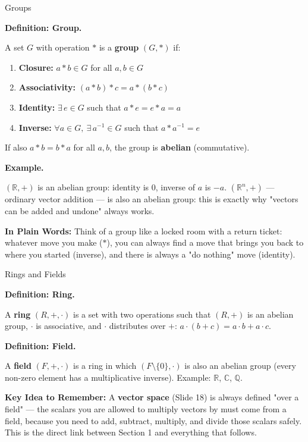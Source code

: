 \documentclass[9pt,aspectratio=169]{beamer}
\newcommand{\keyidea}[1]{%
\par\medskip\noindent\textbf{Key Idea to Remember:} #1\par\medskip}
\newcommand{\childex}[1]{%
\par\medskip\noindent\textbf{In Plain Words:} #1\par\medskip}
\begin{document}
\begin{frame}{Groups}
\par\noindent\textbf{Definition: Group.}\par
A set $G$ with operation $*$ is a \textbf{group} $(G,*)$ if:
\begin{enumerate}
\item \textbf{Closure:} $a*b \in G$ for all $a,b \in G$
\item \textbf{Associativity:} $(a*b)*c = a*(b*c)$
\item \textbf{Identity:} $\exists\, e \in G$ such that $a*e = e*a = a$
\item \textbf{Inverse:} $\forall a \in G,\ \exists\, a^{-1} \in G$ such that $a*a^{-1}=e$
\end{enumerate}
If also $a*b = b*a$ for all $a,b$, the group is \textbf{abelian} (commutative).
\medskip


\par\noindent\textbf{Example.}\par
$(\mathbb{R}, +)$ is an abelian group: identity is $0$, inverse of $a$ is $-a$.
$(\mathbb{R}^n, +)$ --- ordinary vector addition --- is also an abelian group: this is
exactly why "vectors can be added and undone" always works.
\medskip


\childex{Think of a group like a locked room with a return ticket: whatever move you make
($*$), you can always find a move that brings you back to where you started (inverse), and
there is always a "do nothing" move (identity).}
\end{frame}

\begin{frame}{Rings and Fields}
\par\noindent\textbf{Definition: Ring.}\par
A \textbf{ring} $(R, +, \cdot)$ is a set with two operations such that $(R,+)$ is an
abelian group, $\cdot$ is associative, and $\cdot$ distributes over $+$:
$a\cdot(b+c) = a\cdot b + a\cdot c$.
\medskip


\par\noindent\textbf{Definition: Field.}\par
A \textbf{field} $(F,+,\cdot)$ is a ring in which $(F\setminus\{0\}, \cdot)$ is also an
abelian group (every non-zero element has a multiplicative inverse). Example: $\mathbb{R}$,
$\mathbb{C}$, $\mathbb{Q}$.
\medskip


\keyidea{A \textbf{vector space} (Slide 18) is always defined "over a field" --- the
scalars you are allowed to multiply vectors by must come from a field, because you need to
add, subtract, multiply, and divide those scalars safely. This is the direct link between
Section 1 and everything that follows.}
\end{frame}
\end{document}
